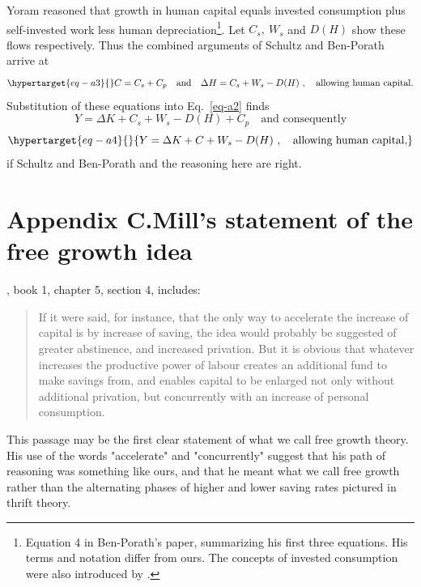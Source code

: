 Yoram \citet{ben-porathProductionHumanCapital1967} reasoned
that growth in human capital equals invested consumption plus
self-invested work less human depreciation\footnote{Equation 4 in
  Ben-Porath's paper, summarizing his first three equations. His terms and
  notation differ from ours. The concepts of invested consumption were
  also introduced by \citet{schultzInvestmentHumanCapital1961}.}.
Let \(C_{s},\ W_{s}\) and \(D(H)\) show these flows respectively.
Thus the combined arguments of Schultz and Ben-Porath arrive at
%
\begin{equation}
\protect\hypertarget{eq-a3}{}
C = C_{s} + C_{p} \quad \text{and}
\quad \Delta H = C_{s} + W_{s} - D(H)\ , \quad \text{allowing
human capital.}\label{eq-a3}
\end{equation}
%
Substitution of these equations into Eq.~\eqref{eq-a2} finds
%
\[Y = \Delta K + C_{s} + W_{s} - D(H) + C_{p} \quad \text{and consequently}\]
%
\vspace{-5ex}
\begin{equation}\protect\hypertarget{eq-a4}{}{Y = \Delta K + C + W_{s} - D(H)\ , \quad \text{allowing human capital,}}\label{eq-a4}\end{equation}
%
if Schultz and Ben-Porath and the reasoning here are right.

\renewcommand{\theequation}{C.\arabic{equation}}
\setcounter{equation}{0}

\hypertarget{appendix-c}{%
\section*{Appendix C.\hspace{0.5em}Mill's statement of the free growth idea}\label{appendix-c}}

\cite{millPrinciplesPoliticalEconomy1848}, book 1, chapter 5, section 4, includes:
\begin{quote}
If it were said, for instance, that the only way to accelerate the increase of capital is by increase of saving, the idea would probably be suggested of greater abstinence, and increased privation. But it is obvious that whatever increases the productive power of labour creates an additional fund to make savings from, and enables capital to be enlarged not only without additional privation, but concurrently with an increase of personal consumption. 
\end{quote}

This passage may be the first clear statement of what we call free growth theory. His use of the words "accelerate" and "concurrently" suggest that his path of reasoning was something like ours, and that he meant what we call free growth rather than the alternating phases of higher and lower saving rates pictured in thrift theory.



\printcredits

% 







